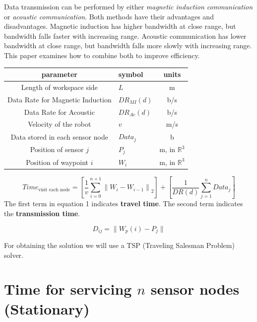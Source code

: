 \documentclass{article}
\begin{document}
 Data transmission can be performed by either \emph{magnetic induction communication} or \emph{acoustic communication}. 
 Both methods have their advantages and disadvantages.
Magnetic induction has higher bandwidth at close range, but bandwidth falls faster with increasing range.
Acoustic communication has lower bandwidth at close range, but bandwidth falls more slowly with increasing range.
This paper examines how to combine both to improve efficiency.
\\
\begin{center}
\begin{tabular}{ c l  c }
parameter & symbol  & units\\ 
\hline
Length of workspace side & $L$ & m\\
 Data Rate for Magnetic Induction & $ DR_{MI}(d)$  & b/s\\ 
 Data Rate for Acoustic  & $ DR_{Ac}(d)$ & b/s \\  
 Velocity of the robot & $ v$ & m/s \\ 
 Data stored in each sensor node   & $ Data_j$ & b\\
 Position of sensor $j$& $P_j$ & m, in $\mathbb{R}^3$\\
  Position of waypoint $i$ & $W_i$ & m, in $\mathbb{R}^3$\\
 \hline
\end{tabular}
\end{center}


\begin{equation}
    \label{TimeEqn_Moving}
   Time_{\textrm{visit each node}}  = \left [\frac{1}{v} \sum_{i=0}^{n+1} \left\| W_{i} - W_{i-1}\right\|_2 \right] +\left [\frac{1}{DR(d)} \sum_{j=1}^{n} Data_j\right]    
\end{equation}
The first term in equation 1 indicates\textbf{ travel time}.
The second term indicates the \textbf{transmission time}.


\label{Dist_Definition}
\begin{equation}
D_{ij} = \|W_{p}(i)-P_{j}\|
\end{equation}


For obtaining the solution we will use a TSP (Traveling Salesman Problem) solver.

\section{Time for servicing $n$ sensor nodes (Stationary)}
\end{document}
